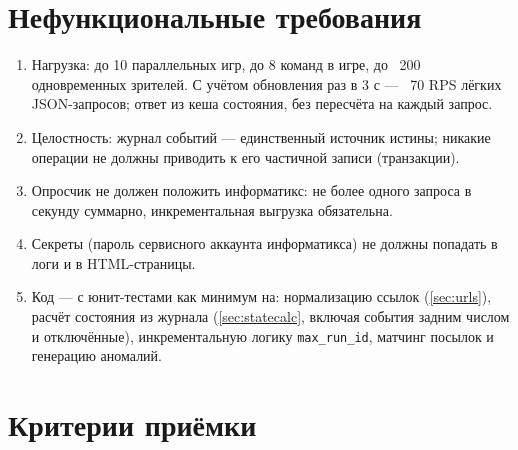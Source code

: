 \documentclass[12pt,a4paper]{article}
\newcommand{\field}[1]{\texttt{#1}}
\begin{document}
\section{Нефункциональные требования}

\begin{enumerate}[nosep]
  \item Нагрузка: до 10 параллельных игр, до 8 команд в игре, до ~200
        одновременных зрителей. С учётом обновления раз в 3 с ---
        ~70 RPS лёгких JSON-запросов; ответ из кеша состояния, без
        пересчёта на каждый запрос.
  \item Целостность: журнал событий --- единственный источник истины;
        никакие операции не должны приводить к его частичной записи
        (транзакции).
  \item Опросчик не должен положить информатикс: не более одного
        запроса в секунду суммарно, инкрементальная выгрузка обязательна.
  \item Секреты (пароль сервисного аккаунта информатикса) не должны
        попадать в логи и в HTML-страницы.
  \item Код --- с юнит-тестами как минимум на: нормализацию ссылок
        (\ref{sec:urls}), расчёт состояния из журнала
        (\ref{sec:statecalc}, включая события задним числом и отключённые),
        инкрементальную логику \field{max\_run\_id}, матчинг посылок и
        генерацию аномалий.
\end{enumerate}

\section{Критерии приёмки}
\end{document}
